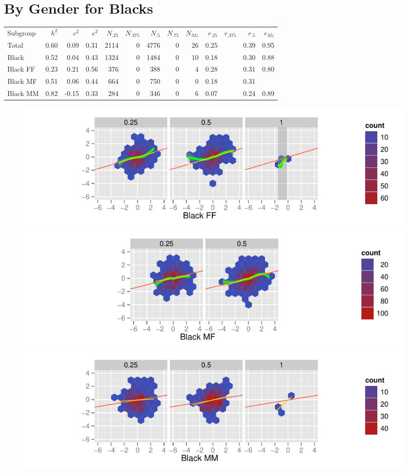 \documentclass[a4paper]{article}
\begin{document}
\newpage
\section{By Gender for Blacks}
\begin{table}[ht]
\begin{center}
\begin{tabular}{l|rrr|rrrrr|rrrr}
 Subgroup & $h^2$ & $c^2$ & $e^2$ & $N_{.25}$ & $N_{.375}$ & $N_{.5}$ & $N_{.75}$ & $N_{Mz}$ & $r_{.25}$ & $r_{.375}$ & $r_{.5}$ & $r_{Mz}$ \\ 
 Total & 0.60 & 0.09 & 0.31 & 2114 &   0 & 4776 &   0 &  26 & 0.25 &  & 0.39 & 0.95 \\ 
   \hline
Black & 0.52 & 0.04 & 0.43 & 1324 &   0 & 1484 &   0 &  10 & 0.18 &  & 0.30 & 0.88 \\ 
  Black FF & 0.23 & 0.21 & 0.56 & 376 &   0 & 388 &   0 &   4 & 0.28 &  & 0.31 & 0.80 \\ 
  Black MF & 0.51 & 0.06 & 0.44 & 664 &   0 & 750 &   0 &   0 & 0.18 &  & 0.31 &  \\ 
  Black MM & 0.82 & -0.15 & 0.33 & 284 &   0 & 346 &   0 &   6 & 0.07 &  & 0.24 & 0.89 \\ 
  \end{tabular}
\end{center}
\end{table}\begin{figure}[htbp]
\includegraphics{Height-018}
\includegraphics{Height-019}
\includegraphics{Height-020}
\end{figure}
\end{document}

